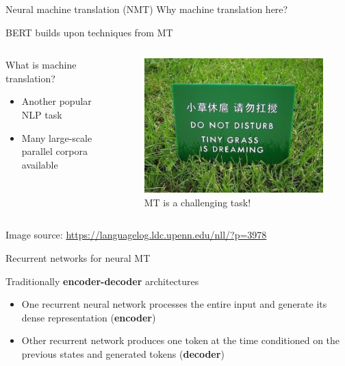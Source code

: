 \documentclass[12pt]{beamer}
\begin{document}
\begin{frame}{Neural machine translation (NMT)}
	Why machine translation here?
	
	BERT builds upon techniques from MT
	
\begin{columns}
	\begin{column}{0.5\textwidth}
	What is machine translation?

\begin{itemize}
	\item Another popular NLP task
	\item Many large-scale parallel corpora available
\end{itemize}

		
	\end{column}
	\begin{column}{0.4\textwidth}
\begin{figure}
	\includegraphics[width=\linewidth]{img/nmt.jpg}
	\caption{MT is a challenging task!}
\end{figure}	
	
\end{column}
\end{columns}
	
\begin{scriptsize}
Image source: \url{https://languagelog.ldc.upenn.edu/nll/?p=3978}
\end{scriptsize}
\end{frame}

\begin{frame}{Recurrent networks for neural MT}
	
Traditionally \textbf{encoder-decoder} architectures	

\begin{itemize}
	\item One recurrent neural network processes the entire input and generate its dense representation (\textbf{encoder})
	\item Other recurrent network produces one token at the time conditioned on the previous states and generated tokens (\textbf{decoder})
\end{itemize}
\end{frame}
\end{document}
